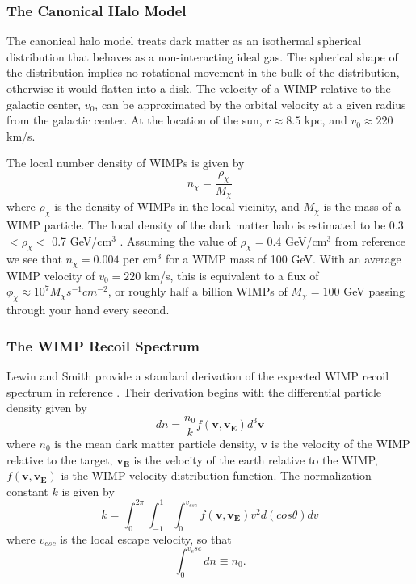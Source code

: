 \documentclass[a4paper,12pt]{article}
\begin{document}
\subsubsection{The Canonical Halo Model}

The canonical halo model treats dark matter as an isothermal spherical distribution that behaves as a non-interacting ideal gas.  The spherical shape of the distribution implies no rotational movement in the bulk of the distribution, otherwise it would flatten into a disk.  The velocity of a WIMP relative to the galactic center, $v_0$, can be approximated by the orbital velocity at a given radius from the galactic center. At the location of the sun, $r \approx 8.5 $ kpc, and $v_0 \approx 220$ km/s. \cite{Piffl}

The local number density of WIMPs is given by
\begin{equation}
n_\chi = \frac{\rho_\chi}{M_\chi}
\end{equation}
where $\rho_\chi$ is the density of WIMPs in the local vicinity, and $M_\chi$ is the mass of a WIMP particle. The local density of the dark matter halo is estimated to be 0.3 $< \rho_\chi <$ 0.7 GeV/cm$^{3}$ \cite{Gates}.  Assuming the value of $\rho_{\chi} = 0.4$ GeV/cm$^{3}$ from reference \cite{Lewin} we see that $n_\chi = 0.004 $ per cm$^3$ for a WIMP mass of 100 GeV.  With an average WIMP velocity of $v_0=220$ km/s, this is equivalent to a flux of $\phi_\chi \approx 10^7 M_\chi s^{-1} cm^{-2}$, or roughly half a billion WIMPs of $M_\chi = 100$ GeV passing through your hand every second.


\subsubsection{The WIMP Recoil Spectrum}

Lewin and Smith provide a standard derivation of the expected WIMP recoil spectrum in reference \cite{Lewin}.  Their derivation begins with the differential particle density given by 
\begin{equation}
dn=\frac{n_0}{k} f(\mathbf{v},\mathbf{v_E}) d^3\mathbf{v}
\end{equation}
where $n_0$ is the mean dark matter particle density, $\mathbf{v}$ is the velocity of the WIMP relative to the target, $\mathbf{v_E}$ is the velocity of the earth relative to the WIMP, $f(\mathbf{v},\mathbf{v_E})$ is the WIMP velocity distribution function.  The normalization constant $k$ is given by
\begin{equation}
k=\int_0^{2\pi}\int_{-1}^{1} \int_0^{v_{esc}}  f(\mathbf{v},\mathbf{v_E}) v^2 d(cos\theta)dv
\end{equation}
where $v_{esc}$ is the local escape velocity, so that 
\begin{equation}
\int_0^{v_esc}dn \equiv n_0.
\end{equation}
\end{document}

